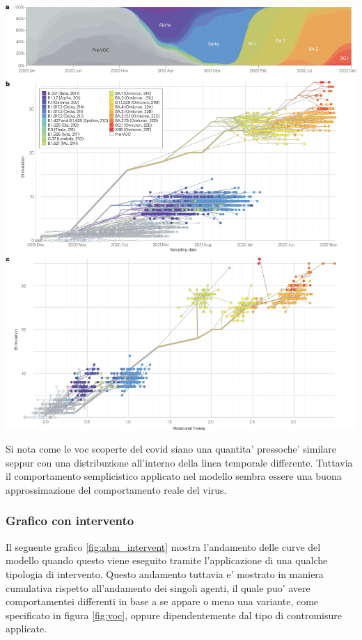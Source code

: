 \begin{minipage}{\linewidth}
	\centering
	\includegraphics[width=\textwidth]{img/41579_2023_878_Fig3_HTML.png}
	\label{fig:covid_mutation}
\end{minipage}

Si nota come le voc scoperte del covid siano una quantita' pressoche' similare seppur con una 
distribuzione all'interno della linea temporale differente. Tuttavia il comportamento semplicistico 
applicato nel modello sembra essere una buona approssimazione del comportamento reale del virus.

\subsubsection*{Grafico con intervento}

Il seguente grafico \ref{fig:abm_intervent} mostra l'andamento delle curve del modello
quando questo viene eseguito tramite l'applicazione di una qualche tipologia di intervento. 
Questo andamento tuttavia e' mostrato in maniera cumulativa rispetto all'andamento dei singoli agenti, il quale puo' avere comportamentei 
differenti in base a se appare o meno una variante, come specificato in figura \ref{fig:voc}, oppure 
dipendentemente dal tipo di contromisure applicate. 

